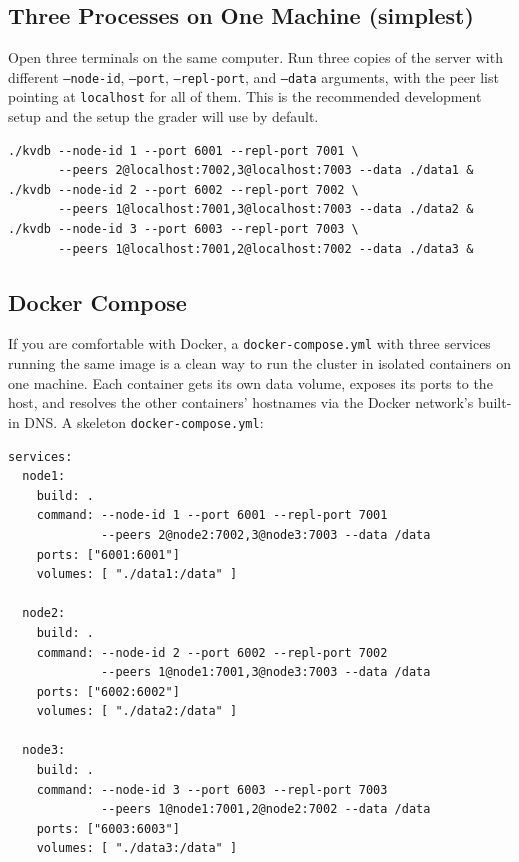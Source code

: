 \documentclass[11pt,a4paper]{article}
\begin{document}
\subsection{Three Processes on One Machine (simplest)}
Open three terminals on the same computer. Run three copies of the server with different \texttt{--node-id}, \texttt{--port}, \texttt{--repl-port}, and \texttt{--data} arguments, with the peer list pointing at \texttt{localhost} for all of them. This is the recommended development setup and the setup the grader will use by default.

\begin{codebox}
\begin{lstlisting}
./kvdb --node-id 1 --port 6001 --repl-port 7001 \
       --peers 2@localhost:7002,3@localhost:7003 --data ./data1 &
./kvdb --node-id 2 --port 6002 --repl-port 7002 \
       --peers 1@localhost:7001,3@localhost:7003 --data ./data2 &
./kvdb --node-id 3 --port 6003 --repl-port 7003 \
       --peers 1@localhost:7001,2@localhost:7002 --data ./data3 &
\end{lstlisting}
\end{codebox}

\subsection{Docker Compose}
If you are comfortable with Docker, a \texttt{docker-compose.yml} with three services running the same image is a clean way to run the cluster in isolated containers on one machine. Each container gets its own data volume, exposes its ports to the host, and resolves the other containers' hostnames via the Docker network's built-in DNS. A skeleton \texttt{docker-compose.yml}:

\begin{codebox}
\begin{lstlisting}
services:
  node1:
    build: .
    command: --node-id 1 --port 6001 --repl-port 7001
             --peers 2@node2:7002,3@node3:7003 --data /data
    ports: ["6001:6001"]
    volumes: [ "./data1:/data" ]

  node2:
    build: .
    command: --node-id 2 --port 6002 --repl-port 7002
             --peers 1@node1:7001,3@node3:7003 --data /data
    ports: ["6002:6002"]
    volumes: [ "./data2:/data" ]

  node3:
    build: .
    command: --node-id 3 --port 6003 --repl-port 7003
             --peers 1@node1:7001,2@node2:7002 --data /data
    ports: ["6003:6003"]
    volumes: [ "./data3:/data" ]
\end{lstlisting}
\end{codebox}
\end{document}
